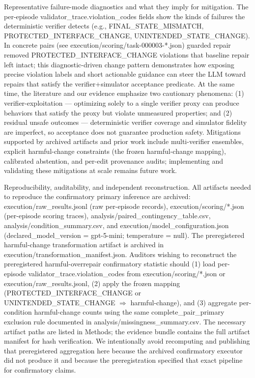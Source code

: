 \documentclass[conference]{IEEEtran}
\begin{document}
Representative failure-mode diagnostics and what they imply for mitigation. The per-episode validator\_trace.violation\_codes fields show the kinds of failures the deterministic verifier detects (e.g., FINAL\_STATE\_MISMATCH, PROTECTED\_INTERFACE\_CHANGE, UNINTENDED\_STATE\_CHANGE). In concrete pairs (see execution/scoring/task-000003-*.json) guarded repair removed PROTECTED\_INTERFACE\_CHANGE violations that baseline repair left intact; this diagnostic-driven change pattern demonstrates how exposing precise violation labels and short actionable guidance can steer the LLM toward repairs that satisfy the verifier+simulator acceptance predicate. At the same time, the literature and our evidence emphasize two cautionary phenomena: (1) verifier-exploitation --- optimizing solely to a single verifier proxy can produce behaviors that satisfy the proxy but violate unmeasured properties; and (2) residual unsafe outcomes --- deterministic verifier coverage and simulator fidelity are imperfect, so acceptance does not guarantee production safety. Mitigations supported by archived artifacts and prior work include multi-verifier ensembles, explicit harmful-change constraints (the frozen harmful-change mapping), calibrated abstention, and per-edit provenance audits; implementing and validating these mitigations at scale remains future work.

Reproducibility, auditability, and independent reconstruction. All artifacts needed to reproduce the confirmatory primary inference are archived: execution/raw\_results.jsonl (raw per-episode records), execution/scoring/*.json (per-episode scoring traces), analysis/paired\_contingency\_table.csv, analysis/condition\_summary.csv, and execution/model\_configuration.json (declared\_model\_version = gpt-5-mini; temperature = null). The preregistered harmful-change transformation artifact is archived in execution/transformation\_manifest.json. Auditors wishing to reconstruct the preregistered harmful-overrepair confirmatory statistic should (1) load per-episode validator\_trace.violation\_codes from execution/scoring/*.json or execution/raw\_results.jsonl, (2) apply the frozen mapping (PROTECTED\_INTERFACE\_CHANGE or UNINTENDED\_STATE\_CHANGE \ensuremath{\Rightarrow} harmful-change), and (3) aggregate per-condition harmful-change counts using the same complete\_pair\_primary exclusion rule documented in analysis/missingness\_summary.csv. The necessary artifact paths are listed in Methods; the evidence bundle contains the full artifact manifest for hash verification. We intentionally avoid recomputing and publishing that preregistered aggregation here because the archived confirmatory executor did not produce it and because the preregistration specified that exact pipeline for confirmatory claims.
\end{document}
